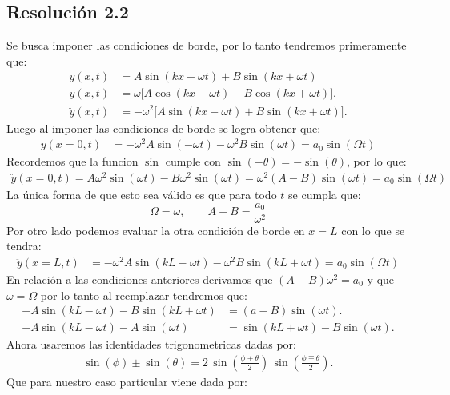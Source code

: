 \documentclass[
  11pt,
  letterpaper,
   addpoints,
   answers
  ]{exam}
\begin{document}
\begin{questions}
\begin{solution}
  \subsection*{Resolución 2.2}
  Se busca imponer las condiciones de borde, por lo tanto tendremos primeramente que:
  \begin{align}
    y(x,t)&=A\sin(kx-\omega t)+B\sin(kx+\omega t)\\
    \dot{y}(x,t)&=\omega\big[A\cos(kx-\omega t)-B\cos(kx+\omega t)\big].\\
    \ddot{y}(x,t)&=-\omega^2\big[A\sin(kx-\omega t)+B\sin(kx+\omega t)\big].
  \end{align}
Luego al imponer las condiciones de borde se logra obtener que:
\begin{align}
  \ddot{y}(x =0,t)&= -\omega^{2}A\sin(-\omega t) - \omega^{2}B\sin(\omega t)  = a_{0}\sin(\Omega t)
\end{align}
Recordemos que la funcion $\sin$ cumple con $\sin(-\theta)=-\sin(\theta)$, por lo que:
\begin{align}
  \ddot{y}(x=0,t) = A\omega^{2}\sin(\omega t) - B\omega^{2}\sin(\omega t) = \omega^{2}(A-B)\sin(\omega t) = a_{0}\sin(\Omega t)
\end{align}
La única forma de que esto sea válido es que para todo $t$ se cumpla que:
  \begin{equation}
    \boxed{
    \Omega=\omega,\qquad A-B=\frac{a_0}{\omega^2}
  }
  \end{equation}
  Por otro lado podemos evaluar la otra condición de borde en $x=L$ con lo que se tendra:
  \begin{align}
    \ddot{y}(x = L,t)&= -\omega^{2}A\sin(kL-\omega t) - \omega^{2}B\sin(kL+\omega t) = a_{0}\sin(\Omega t)
  \end{align}
  En relación a las condiciones anteriores derivamos que $(A-B)\omega^{2} = a_{0}$ y que $\omega= \Omega$ por lo tanto al reemplazar tendremos que:
  \begin{align}
    -A\sin(kL-\omega t) - B\sin(kL+\omega t) &= (a-B)\sin(\omega t).\\
    -A\sin(kL-\omega t) - A\sin(\omega t) &= \sin(kL+\omega t) - B\sin(\omega t).
  \end{align}
  Ahora usaremos las identidades trigonometricas dadas por:
  \begin{align}
    \sin(\phi) \pm \sin(\theta) = 2\,\sin\!\left(\frac{\phi \pm \theta}{2}\right)\,\sin\!\left(\frac{\phi \mp \theta}{2}\right).
  \end{align}
  Que para nuestro caso particular viene dada por:

\end{solution}
\end{questions}
\end{document}
